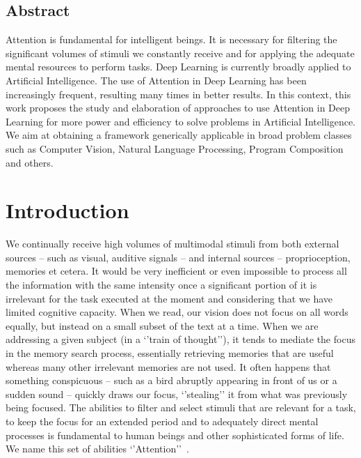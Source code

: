\documentclass[English]{style/ic-tese-v3}
\begin{document}


\section*{Abstract}
Attention is fundamental for intelligent beings.
It is necessary for filtering the significant volumes of stimuli we constantly receive
and for applying the adequate mental resources to perform tasks.
Deep Learning is currently broadly applied to Artificial Intelligence.
The use of Attention in Deep Learning has been increasingly frequent,
resulting many times in better results.
In this context, this work proposes the study and elaboration of approaches to use Attention in Deep Learning
for more power and efficiency to solve problems in Artificial Intelligence.
We aim at obtaining a framework generically applicable in broad problem classes
such as Computer Vision, Natural Language Processing, Program Composition and others.


\chapter{Introduction}
We continually receive high volumes of multimodal stimuli from both external sources
-- such as visual, auditive signals -- and internal sources -- proprioception, memories et cetera.
It would be very inefficient or even impossible to process all the information with
the same intensity once a significant portion of it is irrelevant for
the task executed at the moment and considering that we have limited cognitive capacity.
When we read, our vision does not focus on all
words equally, but instead on a small subset of the text at a time.
When we are addressing a given subject (in a `'train of thought''), it tends to mediate the focus
in the memory search process, essentially retrieving memories that
are useful whereas many other irrelevant memories are not used.
It often happens that something conspicuous
-- such as a bird abruptly appearing in front of us or a sudden sound --
quickly draws our focus, `'stealing'' it from what was previously being focused.
The abilities to filter and select stimuli that are relevant for a task, to keep the focus for an
extended period and to adequately direct mental processes is fundamental to
human beings and other sophisticated forms of life.
We name this set of abilities `'Attention''~\cite{ref:esther-thesis}.
\end{document}
